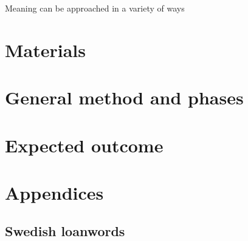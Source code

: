 \documentclass[a4paper]{article}
\begin{document}
Meaning can be approached in a variety of ways \cite{Koptjevskaja-Tamm2008}

\cite{Sijs2005}



\section{Materials} 




\section{General method and phases}




\section{Expected outcome}




\section{Appendices}


\subsection{Swedish loanwords}


\printbibliography
\end{document}
